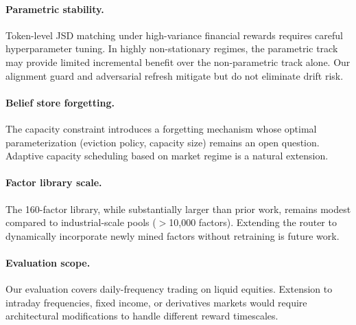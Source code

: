 \paragraph{Parametric stability.} Token-level JSD matching under high-variance financial rewards requires careful hyperparameter tuning. In highly non-stationary regimes, the parametric track may provide limited incremental benefit over the non-parametric track alone. Our alignment guard and adversarial refresh mitigate but do not eliminate drift risk.

\paragraph{Belief store forgetting.} The capacity constraint introduces a forgetting mechanism whose optimal parameterization (eviction policy, capacity size) remains an open question. Adaptive capacity scheduling based on market regime is a natural extension.

\paragraph{Factor library scale.} The 160-factor library, while substantially larger than prior work, remains modest compared to industrial-scale pools ($>$10,000 factors). Extending the router to dynamically incorporate newly mined factors without retraining is future work.

\paragraph{Evaluation scope.} Our evaluation covers daily-frequency trading on liquid equities. Extension to intraday frequencies, fixed income, or derivatives markets would require architectural modifications to handle different reward timescales.

